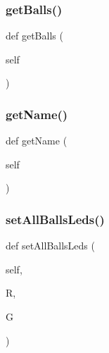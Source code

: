 \subsubsection{\texorpdfstring{get\+Balls()}{getBalls()}}
{\footnotesize\ttfamily def get\+Balls (\begin{DoxyParamCaption}\item[{}]{self }\end{DoxyParamCaption})}

\hypertarget{classgame_1_1_player_1_1player_a91720e5fd3a7e677f314a4b26451b864}{}\label{classgame_1_1_player_1_1player_a91720e5fd3a7e677f314a4b26451b864} 
\subsubsection{\texorpdfstring{get\+Name()}{getName()}}
{\footnotesize\ttfamily def get\+Name (\begin{DoxyParamCaption}\item[{}]{self }\end{DoxyParamCaption})}

\hypertarget{classgame_1_1_player_1_1player_acd6fe061d9978ebb27c7fd1be56f2052}{}\label{classgame_1_1_player_1_1player_acd6fe061d9978ebb27c7fd1be56f2052} 
\subsubsection{\texorpdfstring{set\+All\+Balls\+Leds()}{setAllBallsLeds()}}
{\footnotesize\ttfamily def set\+All\+Balls\+Leds (\begin{DoxyParamCaption}\item[{}]{self,  }\item[{}]{R,  }\item[{}]{G }\end{DoxyParamCaption})}

\hypertarget{classgame_1_1_player_1_1player_a90c95f354f2194c788f6895a7feae1ad}{}\label{classgame_1_1_player_1_1player_a90c95f354f2194c788f6895a7feae1ad} 
